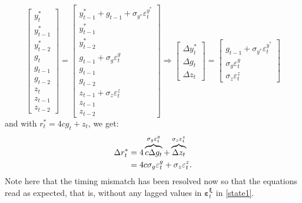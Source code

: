 \documentclass[a4paper,12pt]{article}
\newcommand{\vsp}[1]{\vspace*{#1mm}}\newcommand{\hsp}[1]{\hspace*{#1mm}}  }
\begin{document}
\begin{equation}
\begin{bmatrix}
y_{t}^{\ast } \\ 
y_{t-1}^{\ast } \\ 
y_{t-2}^{\ast } \\ 
g_{t} \\ 
g_{t-1} \\ 
g_{t-2} \\ 
z_{t} \\ 
z_{t-1} \\ 
z_{t-2}%
\end{bmatrix}%
=%
\begin{bmatrix}
y_{t-1}^{\ast }+g_{t-1}+\sigma _{y^{\ast }}\varepsilon _{t}^{y^{\ast }} \\ 
y_{t-1}^{\ast } \\ 
y_{t-2}^{\ast } \\ 
g_{t-1}+\sigma _{g}\varepsilon _{t}^{g} \\ 
g_{t-1} \\ 
g_{t-2} \\ 
z_{t-1}+\sigma _{z}\varepsilon _{t}^{z} \\ 
z_{t-1} \\ 
z_{t-2}%
\end{bmatrix}%
\Rightarrow 
\begin{bmatrix}
\Delta y_{t}^{\ast } \\ 
\Delta g_{t} \\ 
\Delta z_{t}%
\end{bmatrix}%
=%
\begin{bmatrix}
g_{t-1}+\sigma _{y^{\ast }}\varepsilon _{t}^{y^{\ast }} \\ 
\sigma _{g}\varepsilon _{t}^{g} \\ 
\sigma _{z}\varepsilon _{t}^{z}%
\end{bmatrix}
\label{lwb}
\end{equation}%
and with $r_{t}^{\ast }=4cg_{t}+z_{t}$, we get: \vsp{-4} 
\begin{align}
\Delta r_{t}^{\ast }& =4\overbrace{c\Delta g_{t}}^{\sigma _{g}\varepsilon
_{t}^{g}}+\overbrace{\Delta z_{t}}^{\sigma _{z}\varepsilon _{t}^{z}}  \notag
\\
& =4c\sigma _{g}\varepsilon _{t}^{g}+\sigma _{z}\varepsilon _{t}^{z}.
\label{drstar}
\end{align}%
Note here that the timing mismatch has been resolved now so that the
equations read as expected, that is, without any lagged values in $%
\boldsymbol{\varepsilon }_{t}^{\boldsymbol{\xi }}$ in \ref{state1}.
\end{document}
